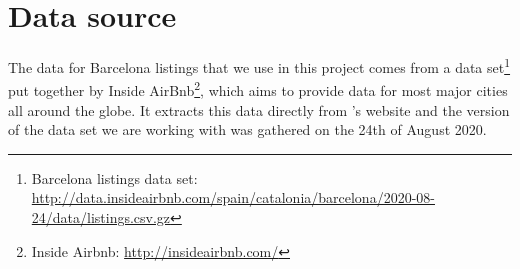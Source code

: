 

\section{Data source}%
\label{sec:data_source}

The \airbnb data for Barcelona listings that we use in this project comes from a data set\footnote{Barcelona listings data set: \url{http://data.insideairbnb.com/spain/catalonia/barcelona/2020-08-24/data/listings.csv.gz}} put together by Inside AirBnb\footnote{Inside Airbnb: \url{http://insideairbnb.com/}}, which aims to provide \airbnb data for most major cities all around the globe. It extracts this data directly from \airbnb's website and the version of the data set we are working with was gathered on the 24th of August 2020.
